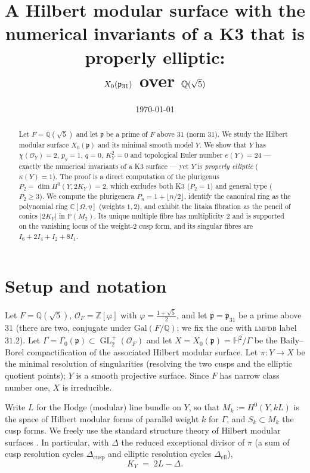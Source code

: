 \documentclass[11pt]{article}
\title{A Hilbert modular surface with the numerical invariants of a K3 that is
  properly elliptic: \\ $X_0(\fp_{31})$ over $\bQ(\sqrt5)$}
\author{}
\date{\today}
\theoremstyle{definition}
\DeclareMathOperator{\GL}{GL}
\newcommand{\bP}{\mathbb{P}}
\newcommand{\bH}{\mathbb{H}}
\newcommand{\bC}{\mathbb{C}}
\newcommand{\bQ}{\mathbb{Q}}
\newcommand{\bZ}{\mathbb{Z}}
\newcommand{\cO}{\mathcal{O}}
\newcommand{\fp}{\mathfrak{p}}
\newcommand{\Om}{\Omega}
\begin{document}
\maketitle

\begin{abstract}
Let $F=\bQ(\sqrt5)$ and let $\fp$ be a prime of $F$ above $31$ (norm $31$).
We study the Hilbert modular surface $X_0(\fp)$ and its minimal smooth model
$Y$. We show that $Y$ has $\chi(\cO_Y)=2$, $p_g=1$, $q=0$, $K_Y^2=0$ and
topological Euler number $e(Y)=24$ --- exactly the numerical invariants of a
K3 surface --- yet $Y$ is \emph{properly elliptic} ($\kappa(Y)=1$). The proof
is a direct computation of the plurigenus $P_2=\dim H^0(Y,2K_Y)=2$, which
excludes both K3 ($P_2=1$) and general type ($P_2\ge 3$). We compute the
plurigenera $P_n=1+\lfloor n/2\rfloor$, identify the canonical ring as the
polynomial ring $\bC[\Om,\eta]$ (weights $1,2$), and exhibit the Iitaka
fibration as the pencil of conics $|2K_Y|$ in $\bP(M_2)$. Its unique multiple
fibre has multiplicity $2$ and is supported on the vanishing locus of the
weight-$2$ cusp form, and its singular fibres are $I_6+2I_4+I_2+8I_1$.
\end{abstract}

\section{Setup and notation}

Let $F=\bQ(\sqrt5)$, $\cO_F=\bZ[\varphi]$ with $\varphi=\tfrac{1+\sqrt5}2$, and
let $\fp=\fp_{31}$ be a prime above $31$ (there are two, conjugate under
$\mathrm{Gal}(F/\bQ)$; we fix the one with \textsc{lmfdb} label $31.2$). Let
$\Gamma=\Gamma_0(\fp)\subset \GL_2^+(\cO_F)$ and let
$X=X_0(\fp)=\overline{\bH^2/\Gamma}$ be the Baily--Borel compactification of the
associated Hilbert modular surface. Let $\pi\colon Y\to X$ be the minimal
resolution of singularities (resolving the two cusps and the elliptic
quotient points); $Y$ is a smooth projective surface. Since $F$ has narrow
class number one, $X$ is irreducible.

Write $L$ for the Hodge (modular) line bundle on $Y$, so that
$M_k:=H^0(Y,kL)$ is the space of Hilbert modular forms of parallel weight $k$
for $\Gamma$, and $S_k\subset M_k$ the cusp forms. We freely use the standard
structure theory of Hilbert modular surfaces \cite{vdG}. In particular, with
$\Delta$ the reduced exceptional divisor of $\pi$ (a sum of cusp resolution
cycles $\Delta_{\mathrm{cusp}}$ and elliptic resolution cycles
$\Delta_{\mathrm{ell}}$),
\begin{equation}\label{eq:canonical}
  K_Y \;=\; 2L-\Delta .
\end{equation}
\end{document}
